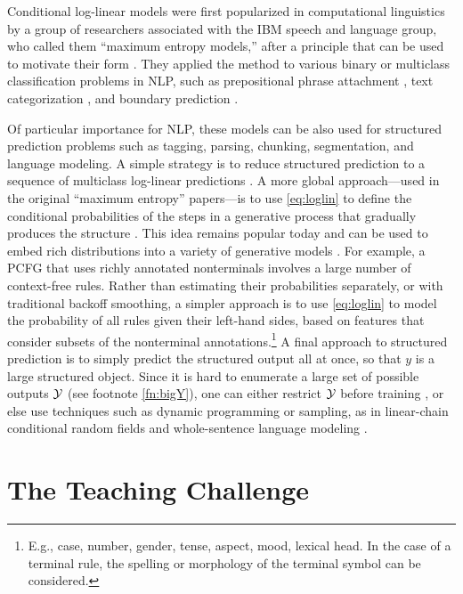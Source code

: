 \documentclass[11pt,letterpaper]{article}
\begin{document}
Conditional log-linear models were first popularized in computational
linguistics by a group of researchers associated with the IBM speech
and language group, who called them ``maximum entropy models,'' after
a principle that can be used to motivate their form
\cite{jaynes-1957}.  They applied the method to various binary or
multiclass classification problems in NLP, such as prepositional
phrase attachment \cite{ratnaparkhi-1994}, text categorization
\cite{nigam-lafferty-mccallum-1999}, and boundary prediction
\cite{beeferman-berger-lafferty-1999}.

Of particular importance for NLP, these models can be also used for
structured prediction problems such as tagging, parsing, chunking,
segmentation, and language modeling.  A simple strategy is to reduce
structured prediction to a sequence of multiclass log-linear
predictions \cite{ratnaparkhi-1998}.  A more global approach---used in
the original ``maximum entropy'' papers---is to use \eqref{eq:loglin}
to define the conditional probabilities of the steps in a generative
process that gradually produces the structure
\cite{rosenfeld-1994,berger-dellapietra-dellapietra-1996}.  This idea
remains popular today and can be used to embed rich distributions
into a variety of generative models \cite{bergkirkpatrick-et-al-2010}.
For example, a PCFG that uses richly annotated nonterminals involves a
large number of context-free rules.  Rather than estimating their
probabilities separately, or with traditional backoff smoothing, a
simpler approach is to use \eqref{eq:loglin} to model the probability
of all rules given their left-hand sides, based on features that
consider subsets of the nonterminal annotations.\footnote{E.g., case,
  number, gender, tense, aspect, mood, lexical head.  In the case of a
  terminal rule, the spelling or morphology of the terminal symbol can
  be considered.}  A final approach to structured prediction is to
simply predict the structured output all at once, so that $y$ is a
large structured object.  Since it is hard to enumerate
a large set of possible outputs ${\cal Y}$ (see footnote
\ref{fn:bigY}), one can either restrict ${\cal Y}$ before training
\cite{johnson-et-al-1999}, or else use techniques such as dynamic
programming or sampling, as in linear-chain conditional random fields
\cite{lafferty-mccallum-pereira-2001} and whole-sentence language
modeling \cite{rosenfeld-chen-zhu-2001}.

\section{The Teaching Challenge} \label{sec:challenges}
\end{document}

